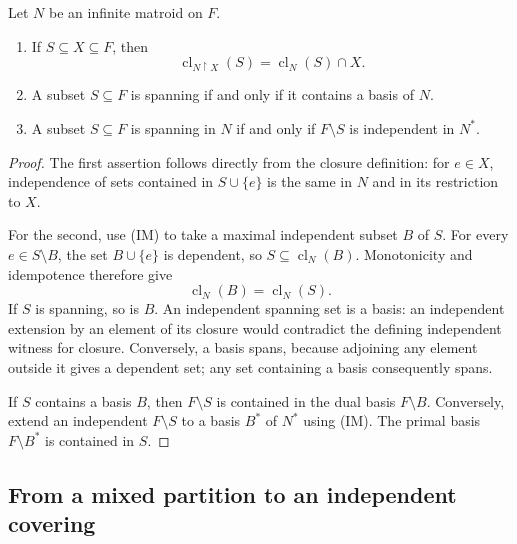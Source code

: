 \begin{lemma}\label{lem:closure-duality}
Let $N$ be an infinite matroid on $F$.
\begin{enumerate}
\item If $S\subseteq X\subseteq F$, then
\[
 \operatorname{cl}_{N\upharpoonright X}(S)
   =\operatorname{cl}_N(S)\cap X.
\]
\item A subset $S\subseteq F$ is spanning if and only if it contains
  a basis of $N$.
\item A subset $S\subseteq F$ is spanning in $N$ if and only if
  $F\setminus S$ is independent in $N^*$.
\end{enumerate}
\end{lemma}
\begin{proof}
The first assertion follows directly from the closure definition:
for $e\in X$, independence of sets contained in $S\cup\{e\}$ is
the same in $N$ and in its restriction to $X$.

For the second, use (IM) to take a maximal independent subset $B$ of
$S$. For every $e\in S\setminus B$, the set $B\cup\{e\}$ is
dependent, so $S\subseteq\operatorname{cl}_N(B)$. Monotonicity and
idempotence therefore give
\[
 \operatorname{cl}_N(B)=\operatorname{cl}_N(S).
\]
If $S$ is spanning, so is $B$. An independent spanning set is a basis:
an independent extension by an element of its closure would contradict
the defining independent witness for closure. Conversely, a basis spans,
because adjoining any element outside it gives a dependent set; any set
containing a basis consequently spans.

If $S$ contains a basis $B$, then $F\setminus S$ is contained in
the dual basis $F\setminus B$. Conversely, extend an independent
$F\setminus S$ to a basis $B^*$ of $N^*$ using (IM).
The primal basis $F\setminus B^*$ is contained in $S$.
\end{proof}

\subsection{From a mixed partition to an independent covering}


